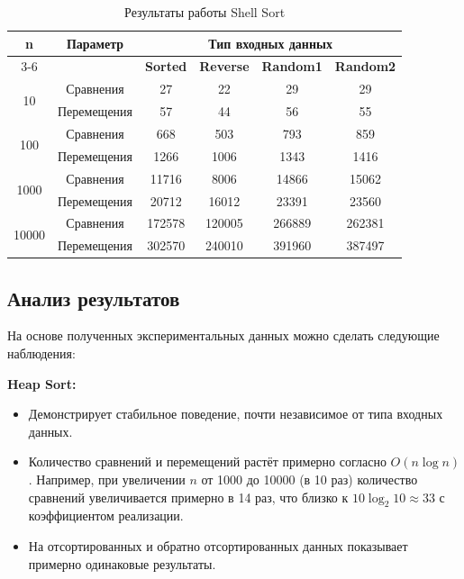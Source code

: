 \documentclass[a4paper,12pt,titlepage]{article}
\begin{document}
\begin{table}[H]
\small
\centering
\begin{tabular}{|c|c|c|c|c|c|}
    \hline
    \multirow{2}{*}{\textbf{n}} & \multirow{2}{*}{\textbf{Параметр}} & \multicolumn{4}{|c|}{\textbf{Тип входных данных}} \\
    \cline{3-6}
    & & \textbf{Sorted} & \textbf{Reverse} & \textbf{Random1} & \textbf{Random2} \\
    \hline
    \multirow{2}{*}{10} & Сравнения & 27 & 22 & 29 & 29 \\
    \cline{2-6}
                        & Перемещения & 57 & 44 & 56 & 55 \\
    \hline
    \multirow{2}{*}{100} & Сравнения & 668 & 503 & 793 & 859 \\
    \cline{2-6}
                         & Перемещения & 1266 & 1006 & 1343 & 1416 \\
    \hline
    \multirow{2}{*}{1000} & Сравнения & 11716 & 8006 & 14866 & 15062 \\
    \cline{2-6}
                          & Перемещения & 20712 & 16012 & 23391 & 23560 \\
    \hline
    \multirow{2}{*}{10000} & Сравнения & 172578 & 120005 & 266889 & 262381 \\
    \cline{2-6}
                           & Перемещения & 302570 & 240010 & 391960 & 387497 \\
    \hline
\end{tabular}
\caption{Результаты работы Shell Sort}
\end{table}

\subsection{Анализ результатов}

На основе полученных экспериментальных данных можно сделать следующие наблюдения:

\textbf{Heap Sort:}
\begin{itemize}
    \item Демонстрирует стабильное поведение, почти независимое от типа входных данных.
    \item Количество сравнений и перемещений растёт примерно согласно $O(n \log n)$. Например, при увеличении $n$ от 1000 до 10000 (в 10 раз) количество сравнений увеличивается примерно в 14 раз, что близко к $10 \log_2 10 \approx 33$ с коэффициентом реализации.
    \item На отсортированных и обратно отсортированных данных показывает примерно одинаковые результаты.
\end{itemize}
\end{document}
